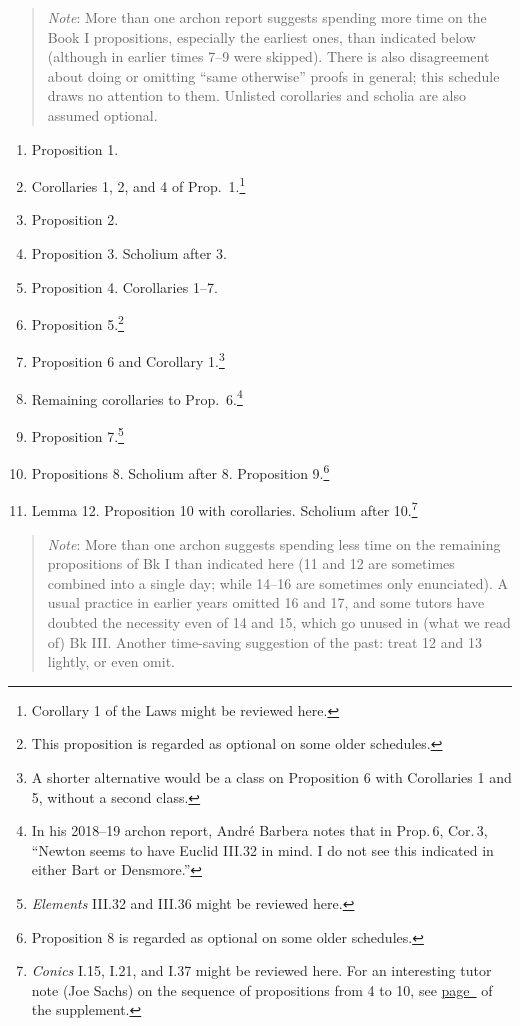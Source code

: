 \documentclass[10pt]{article}
\begin{document}
		\begin{quote}
	\small{\emph{Note}: More than one archon report
		suggests spending more time on the Book I
		propositions, especially the earliest ones,
		than indicated below (although in earlier
		times 7--9 were skipped).  There is also
		disagreement about doing or omitting ``same
		otherwise'' proofs in general; this schedule
		draws no attention to them. Unlisted
		corollaries and scholia are also assumed
		optional.} \end{quote}
\begin{enumerate}[resume*] \item Proposition 1.  \item
		Corollaries 1, 2, and 4 of
		Prop.~1.\footnote{Corollary 1 of the Laws
			might be reviewed here.} \item
		Proposition 2.  \item Proposition 3.
		Scholium after 3.  \item Proposition 4.
		Corollaries 1--7.  \item Proposition
		5.\footnote{This proposition is regarded as
			optional on some older schedules.}
	\item Proposition 6 and Corollary 1.\footnote{A
			shorter alternative would be
			a class on Proposition 6 with Corollaries 1 and
			5, without a second class.}  \item
		Remaining corollaries to Prop.~6.\footnote{In his 2018--19 archon report, Andr\'e Barbera notes that in Prop.\,6, Cor.\,3, ``Newton seems to have Euclid III.32 in mind. I do not see
		this indicated in either Bart or Densmore.''}
		  \item
		Proposition 7.\footnote{\emph{Elements}
			III.32 and III.36 might be reviewed
			here.} \item Propositions 8.
		Scholium after 8. Proposition
		9.\footnote{Proposition 8 is regarded as
			optional on some older schedules.}
	\item Lemma 12. Proposition 10 with corollaries.
		Scholium after 10.\footnote{\emph{Conics}
			I.15, I.21, and I.37 might be
			reviewed here. For an interesting
			tutor note (Joe Sachs) on the
			sequence of propositions from 4 to
			10, see
			\hyperref[supple.77]{page~\pageref{supple.77}}
			of the supplement.} \end{enumerate}
\begin{quote} \small{\emph{Note}: More than one archon
		suggests spending less time on the remaining
		propositions of Bk I than indicated here (11
		and 12 are sometimes combined into a single
		day; while 14–16 are sometimes only
		enunciated). A usual practice in earlier
		years omitted 16 and 17, and some tutors
		have doubted the necessity even of 14 and
		15, which go unused in (what we read of) Bk
		III. Another time-saving suggestion of the
		past: treat 12 and 13 lightly, or even
		omit.}  \end{quote}
\end{document}
